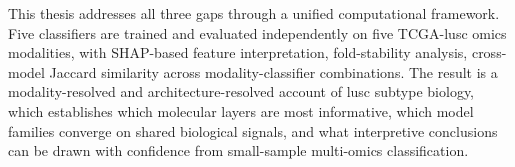 This thesis addresses all three gaps through a unified computational framework. Five classifiers are trained and evaluated independently on five TCGA-\gls{lusc} omics modalities, with SHAP-based feature interpretation, fold-stability analysis, cross-model Jaccard similarity across modality-classifier combinations. The result is a modality-resolved and architecture-resolved account of \gls{lusc} subtype biology, which establishes which molecular layers are most informative, which model families converge on shared biological signals, and what interpretive conclusions can be drawn with confidence from small-sample multi-omics classification.
